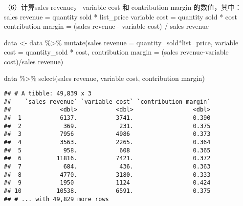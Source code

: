 \documentclass[
]{article}
\newenvironment{Shaded}{\begin{snugshade}}{\end{snugshade}}
\newcommand{\AttributeTok}[1]{\textcolor[rgb]{0.77,0.63,0.00}{#1}}
\newcommand{\FunctionTok}[1]{\textcolor[rgb]{0.00,0.00,0.00}{#1}}
\newcommand{\NormalTok}[1]{#1}
\newcommand{\OtherTok}[1]{\textcolor[rgb]{0.56,0.35,0.01}{#1}}
\newcommand{\SpecialCharTok}[1]{\textcolor[rgb]{0.00,0.00,0.00}{#1}}
\newcommand{\StringTok}[1]{\textcolor[rgb]{0.31,0.60,0.02}{#1}}
\begin{document}
（6）计算sales revenue， variable cost 和 contribution margin
的数值，其中： sales revenue = quantity sold * list\_price variable cost
= quantity sold * cost contribution margin = (sales revenue - variable
cost) / sales revenue

\begin{Shaded}
\begin{Highlighting}[]
\NormalTok{data }\OtherTok{\textless{}{-}}\NormalTok{ data }\SpecialCharTok{\%\textgreater{}\%}
  \FunctionTok{mutate}\NormalTok{(}\StringTok{\textasciigrave{}}\AttributeTok{sales revenue}\StringTok{\textasciigrave{}} \OtherTok{=}\NormalTok{ quantity\_sold}\SpecialCharTok{*}\NormalTok{list\_price, }\StringTok{\textasciigrave{}}\AttributeTok{variable cost}\StringTok{\textasciigrave{}} \OtherTok{=}\NormalTok{ quantity\_sold }\SpecialCharTok{*}\NormalTok{ cost, }\StringTok{\textasciigrave{}}\AttributeTok{contribution margin}\StringTok{\textasciigrave{}} \OtherTok{=}\NormalTok{ (}\StringTok{\textasciigrave{}}\AttributeTok{sales revenue}\StringTok{\textasciigrave{}}\SpecialCharTok{{-}}\StringTok{\textasciigrave{}}\AttributeTok{variable cost}\StringTok{\textasciigrave{}}\NormalTok{)}\SpecialCharTok{/}\StringTok{\textasciigrave{}}\AttributeTok{sales revenue}\StringTok{\textasciigrave{}}\NormalTok{)}

\NormalTok{data }\SpecialCharTok{\%\textgreater{}\%}
  \FunctionTok{select}\NormalTok{(}\StringTok{\textasciigrave{}}\AttributeTok{sales revenue}\StringTok{\textasciigrave{}}\NormalTok{, }\StringTok{\textasciigrave{}}\AttributeTok{variable cost}\StringTok{\textasciigrave{}}\NormalTok{, }\StringTok{\textasciigrave{}}\AttributeTok{contribution margin}\StringTok{\textasciigrave{}}\NormalTok{)}
\end{Highlighting}
\end{Shaded}

\begin{verbatim}
## # A tibble: 49,839 x 3
##    `sales revenue` `variable cost` `contribution margin`
##              <dbl>           <dbl>                 <dbl>
##  1           6137.           3741.                 0.390
##  2            369.            231.                 0.375
##  3           7956            4986                  0.373
##  4           3563.           2265.                 0.364
##  5            958.            608                  0.365
##  6          11816.           7421.                 0.372
##  7            684.            436.                 0.363
##  8           4770.           3180.                 0.333
##  9           1950            1124                  0.424
## 10          10538.           6591.                 0.375
## # ... with 49,829 more rows
\end{verbatim}
\end{document}
